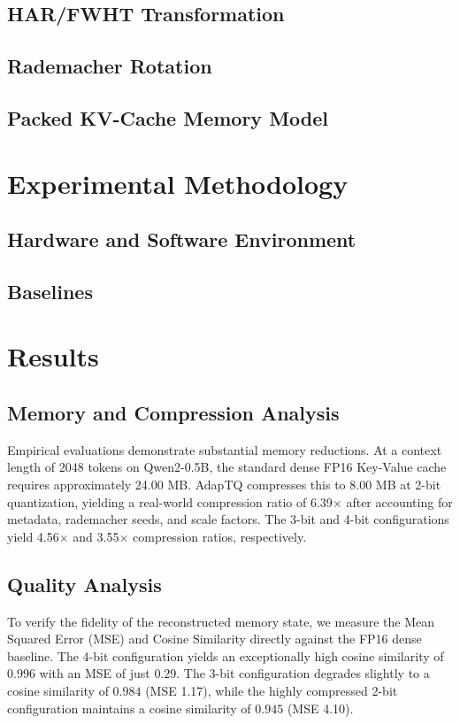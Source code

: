 \documentclass[sigconf]{acmart}
\begin{document}
\subsection{HAR/FWHT Transformation}
\subsection{Rademacher Rotation}
\subsection{Packed KV-Cache Memory Model}

\section{Experimental Methodology}
\subsection{Hardware and Software Environment}
\subsection{Baselines}

\section{Results}
\subsection{Memory and Compression Analysis}
Empirical evaluations demonstrate substantial memory reductions. At a context length of 2048 tokens on Qwen2-0.5B, the standard dense FP16 Key-Value cache requires approximately 24.00 MB. AdapTQ compresses this to 8.00 MB at 2-bit quantization, yielding a real-world compression ratio of 6.39$\times$ after accounting for metadata, rademacher seeds, and scale factors. The 3-bit and 4-bit configurations yield 4.56$\times$ and 3.55$\times$ compression ratios, respectively.

\subsection{Quality Analysis}
To verify the fidelity of the reconstructed memory state, we measure the Mean Squared Error (MSE) and Cosine Similarity directly against the FP16 dense baseline. The 4-bit configuration yields an exceptionally high cosine similarity of $0.996$ with an MSE of just $0.29$. The 3-bit configuration degrades slightly to a cosine similarity of $0.984$ (MSE 1.17), while the highly compressed 2-bit configuration maintains a cosine similarity of $0.945$ (MSE 4.10). 
\end{document}
